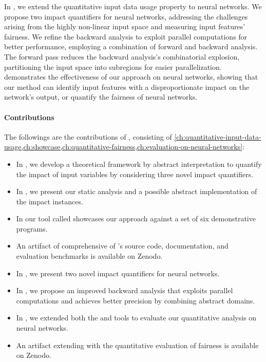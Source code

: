 In , we extend the quantitative input data usage property to neural networks.
We propose two impact quantifiers for neural networks, addressing the challenges arising from the highly non-linear input space and measuring input features' fairness.
We refine the backward analysis to exploit parallel computations for better performance, employing a combination of forward and backward analysis.
The forward pass reduces the backward analysis's combinatorial explosion, partitioning the input space into subregions for easier parallelization.
 demonstrates the effectiveness of our approach on neural networks, showing that our method can identify input features with a disproportionate impact on the network's output, or quantify the fairness of neural networks.



\paragraph{Contributions}
The followings are the contributions of , consisting of \cref{ch:quantitative-input-data-usage,ch:showcase,ch:quantitative-fairness,ch:evaluation-on-neural-networks}:

\begin{itemize}
  \item In , we develop a theoretical framework by abstract interpretation to quantify the impact of input variables by considering three novel impact quantifiers.
  \item In , we present our static analysis and a possible abstract implementation of the impact instances.
  \item In  our tool called \impatto{} showcases our approach against a set of six demonstrative programs.
  \item An artifact of \impatto{} comprehensive of \impatto's source code, documentation, and evaluation benchmarks is available on Zenodo.\sidenote{\impattozenodo}
  \item In , we present two novel impact quantifiers for neural networks.
  \item In , we propose an improved backward analysis that exploits parallel computations and achieves better precision by combining abstract domains.
  \item In , we extended both the \impatto{} and \libra\sidenote{\libraurl} tools to evaluate our quantitative analysis on neural networks.
  \item An artifact extending \libra{} with the quantitative evaluation of fairness is available on Zenodo.\sidenote{\librazenodo}
\end{itemize}

